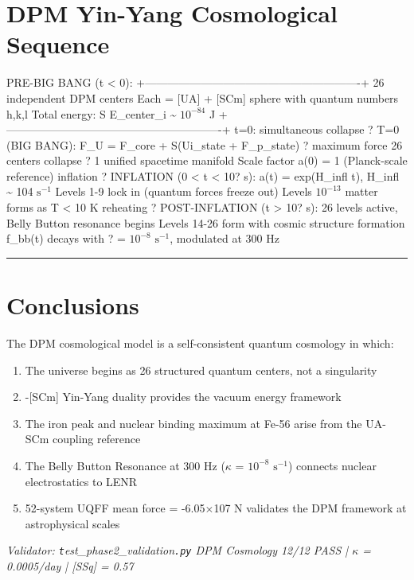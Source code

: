\documentclass[12pt,a4paper]{article}
\begin{document}
\section{DPM Yin-Yang Cosmological Sequence}

PRE-BIG BANG (t < 0): +----------------------------------------------------------+ 26 independent DPM centers Each = [UA] + [SCm] sphere with quantum numbers h,k,l Total energy: S E\_{center\_i} \textasciitilde{} $10^{-84}$ J +----------------------------------------------------------+ t=0: simultaneous collapse ? T=0 (BIG BANG): F\_U = F\_core + S(Ui\_state + F\_{p\_state}) ? maximum force 26 centers collapse ? 1 unified spacetime manifold Scale factor a(0) = 1 (Planck-scale reference) inflation ? INFLATION (0 < t < 10? s): a(t) = exp(H\_infl  t), H\_infl \textasciitilde{} 104 $\mathrm{s}^{-1}$ Levels 1-9 lock in (quantum forces freeze out) Levels $10^{-13}$ matter forms as T < 10 K reheating ? POST-INFLATION (t > 10? s): 26 levels active, Belly Button resonance begins Levels 14-26 form with cosmic structure formation f\_bb(t) decays with ? = $10^{-8}$ $\mathrm{s}^{-1}$, modulated at 300 Hz

\medskip\hrule\medskip

\section{Conclusions}

The DPM cosmological model is a self-consistent quantum cosmology in which:

\begin{enumerate}
  \item The universe begins as 26 structured quantum centers, not a singularity
  \item [UA]-[SCm] Yin-Yang duality provides the vacuum energy framework
  \item The iron peak and nuclear binding maximum at Fe-56 arise from the UA-SCm coupling reference
  \item The Belly Button Resonance at 300 Hz ($\kappa$ = $10^{-8}$ $\mathrm{s}^{-1}$) connects nuclear electrostatics to LENR
  \item 52-system UQFF mean force = -6.05$\times$107 N validates the DPM framework at astrophysical scales
\end{enumerate}

\emph{Validator: \texttt{t}est\_{phase2\_validation}\texttt{.py} DPM Cosmology 12/12 PASS | $\kappa$ = 0.0005/day | [SSq] = 0.57}
\end{document}
